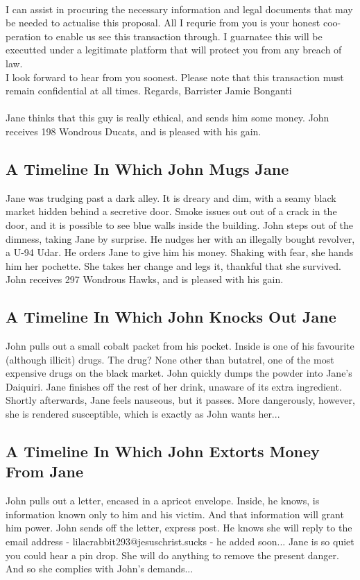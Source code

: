 \documentclass{article}
\begin{document}
\\
I can assist in procuring the necessary information and legal documents that may be needed to actualise this proposal.
All I requrie from you is your honest coo{-}peration to enable us see this transaction through.
I guarnatee this will be executted under a legitimate platform that will protect you from any breach of law.
\\
I look forward to hear from you soonest.
Please note that this transaction must remain confidential at all times.
Regards, Barrister Jamie Bonganti
\\\\
Jane thinks that this guy is really ethical, and sends him some money.
John receives 198 Wondrous Ducats, and is pleased with his gain.
\subsection{A Timeline In Which John Mugs Jane}


Jane was trudging past a dark alley.
It is dreary and dim, with a seamy black market hidden behind a secretive door.
Smoke issues out out of a crack in the door, and it is possible to see blue walls inside the building.
John steps out of the dimness, taking Jane by surprise.
He nudges her with an illegally bought revolver, a U{-}94 Udar.
He orders Jane to give him his money.
Shaking with fear, she hands him her pochette.
She takes her change and legs it, thankful that she survived.
John receives 297 Wondrous Hawks, and is pleased with his gain.
\subsection{A Timeline In Which John Knocks Out Jane}


John pulls out a small cobalt packet from his pocket. Inside is one of his favourite (although illicit) drugs.
The drug? None other than butatrel, one of the most expensive drugs on the black market.
John quickly dumps the powder into Jane's Daiquiri.
Jane finishes off the rest of her drink, unaware of its extra ingredient.
Shortly afterwards, Jane feels nauseous, but it passes.
More dangerously, however, she is rendered susceptible, which is exactly as John wants her...
\subsection{A Timeline In Which John Extorts Money From Jane}


John pulls out a letter, encased in a apricot envelope. Inside, he knows, is information known only to him and his victim. And that information will grant him power.
John sends off the letter, express post. He knows she will reply to the email address {-} lilacrabbit293@jesuschrist.sucks {-} he added soon...
Jane is so quiet you could hear a pin drop. She will do anything to remove the present danger. And so she complies with John's demands...
\end{document}
